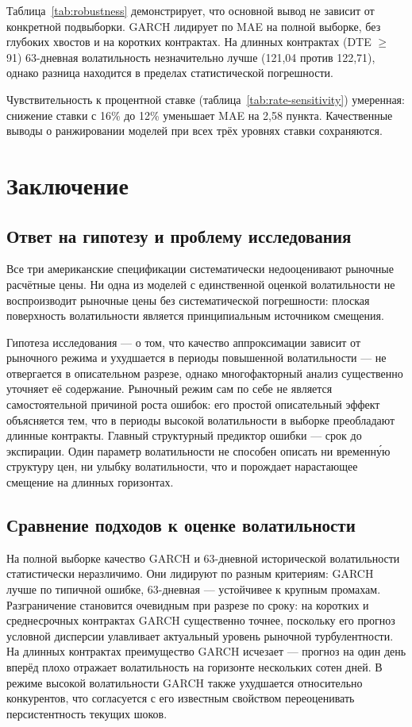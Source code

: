 \documentclass[11pt,a4paper]{article}
\begin{document}
Таблица~\ref{tab:robustness} демонстрирует, что основной вывод не зависит от конкретной подвыборки. GARCH лидирует по MAE на полной выборке, без глубоких хвостов и на коротких контрактах. На длинных контрактах (DTE $\geq$ 91) 63-дневная волатильность незначительно лучше (121,04 против 122,71), однако разница находится в пределах статистической погрешности.

Чувствительность к процентной ставке (таблица~\ref{tab:rate-sensitivity}) умеренная: снижение ставки с 16\% до 12\% уменьшает MAE на 2,58 пункта. Качественные выводы о ранжировании моделей при всех трёх уровнях ставки сохраняются.

\section{Заключение}

\subsection{Ответ на гипотезу и проблему исследования}

Все три американские спецификации систематически недооценивают рыночные расчётные цены. Ни одна из моделей с единственной оценкой волатильности не воспроизводит рыночные цены без систематической погрешности: плоская поверхность волатильности является принципиальным источником смещения.

Гипотеза исследования --- о том, что качество аппроксимации зависит от рыночного режима и ухудшается в периоды повышенной волатильности --- не отвергается в описательном разрезе, однако многофакторный анализ существенно уточняет её содержание. Рыночный режим сам по себе не является самостоятельной причиной роста ошибок: его простой описательный эффект объясняется тем, что в периоды высокой волатильности в выборке преобладают длинные контракты. Главный структурный предиктор ошибки --- срок до экспирации. Один параметр волатильности не способен описать ни временну́ю структуру цен, ни улыбку волатильности, что и порождает нарастающее смещение на длинных горизонтах.

\subsection{Сравнение подходов к оценке волатильности}

На полной выборке качество GARCH и 63-дневной исторической волатильности статистически неразличимо. Они лидируют по разным критериям: GARCH лучше по типичной ошибке, 63-дневная --- устойчивее к крупным промахам. Разграничение становится очевидным при разрезе по сроку: на коротких и среднесрочных контрактах GARCH существенно точнее, поскольку его прогноз условной дисперсии улавливает актуальный уровень рыночной турбулентности. На длинных контрактах преимущество GARCH исчезает --- прогноз на один день вперёд плохо отражает волатильность на горизонте нескольких сотен дней. В режиме высокой волатильности GARCH также ухудшается относительно конкурентов, что согласуется с его известным свойством переоценивать персистентность текущих шоков.
\end{document}
